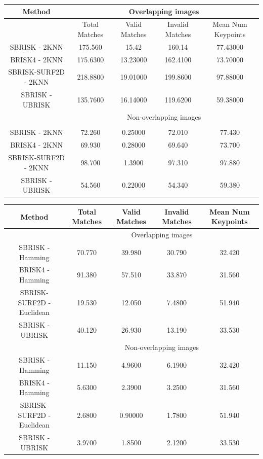 \documentclass{article}
\begin{document}
\begin{table}
\begin{tabular}{|c|c|c|c|c|}
\hline 
Method & \multicolumn{4}{c}{Overlapping images}\tabularnewline
\hline 
\hline 
 & Total Matches & Valid Matches & Invalid Matches & Mean Num Keypoints\tabularnewline
\hline 
SBRISK - 2KNN & 175.560 & 15.42 & 160.14 & 77.43000\tabularnewline
\hline 
BRISK4 - 2KNN & 175.6300 & 13.23000 & 162.4100 & 73.70000\tabularnewline
\hline 
SBRISK-SURF2D - 2KNN & 218.8800 & 19.01000 & 199.8600 & 97.88000\tabularnewline
\hline 
SBRISK - UBRISK & 135.7600 & 16.14000 & 119.6200 & 59.38000\tabularnewline
\hline 
 & \multicolumn{4}{c}{Non-overlapping images}\tabularnewline
\hline 
 &  &  &  & \tabularnewline
\hline 
SBRISK - 2KNN & 72.260 & 0.25000 & 72.010 & 77.430\tabularnewline
\hline 
BRISK4 - 2KNN & 69.930 & 0.28000 & 69.640 & 73.700\tabularnewline
\hline 
SBRISK-SURF2D - 2KNN & 98.700 & 1.3900 & 97.310 & 97.880\tabularnewline
\hline 
SBRISK - UBRISK & 54.560 & 0.22000 & 54.340 & 59.380\tabularnewline
\hline 
\end{tabular}
\label{tab:keypointsMatchesKNN}
\end{table}

\begin{table}
\begin{tabular}{|c|c|c|c|c|}
\hline 
Method & Total Matches & Valid Matches & Invalid Matches & Mean Num Keypoints\tabularnewline
\hline 
\hline 
 & \multicolumn{4}{c}{Overlapping images}\tabularnewline
\hline 
SBRISK - Hamming & 70.770 & 39.980 & 30.790 & 32.420\tabularnewline
\hline 
BRISK4 - Hamming & 91.380 & 57.510 & 33.870 & 31.560\tabularnewline
\hline 
SBRISK-SURF2D - Euclidean & 19.530 & 12.050 & 7.4800 & 51.940\tabularnewline
\hline 
SBRISK - UBRISK & 40.120 & 26.930 & 13.190 & 33.530\tabularnewline
\hline 
 & \multicolumn{4}{c}{Non-overlapping images}\tabularnewline
\hline 
SBRISK - Hamming & 11.150 & 4.9600 & 6.1900 & 32.420\tabularnewline
\hline 
BRISK4 - Hamming & 5.6300 & 2.3900 & 3.2500 & 31.560\tabularnewline
\hline 
SBRISK-SURF2D - Euclidean & 2.6800 & 0.90000 & 1.7800 & 51.940\tabularnewline
\hline 
SBRISK - UBRISK & 3.9700 & 1.8500 & 2.1200 & 33.530\tabularnewline
\hline 
\end{tabular}
\label{tab:keypointsMatchesHamming}
\end{table}
\end{document}
